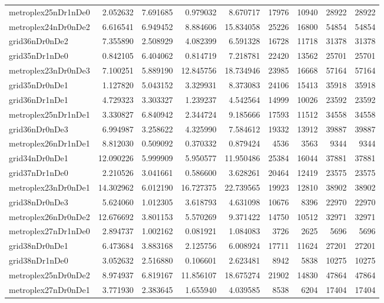 \begin{longtable}{|l|r|r|r|r|r|r|r|r|}
metroplex25nDr1nDe0 & 2.052632 & 7.691685 & 0.979032 & 8.670717 & 17976 & 10940 & 28922 & 28922 \\
metroplex24nDr0nDe2 & 6.616541 & 6.949452 & 8.884606 & 15.834058 & 25226 & 16800 & 54854 & 54854 \\
grid36nDr0nDe2 & 7.355890 & 2.508929 & 4.082399 & 6.591328 & 16728 & 11718 & 31378 & 31378 \\
grid35nDr1nDe0 & 0.842105 & 6.404062 & 0.814719 & 7.218781 & 22420 & 13562 & 25701 & 25701 \\
metroplex23nDr0nDe3 & 7.100251 & 5.889190 & 12.845756 & 18.734946 & 23985 & 16668 & 57164 & 57164 \\
grid35nDr0nDe1 & 1.127820 & 5.043152 & 3.329931 & 8.373083 & 24106 & 15413 & 35918 & 35918 \\
grid36nDr1nDe1 & 4.729323 & 3.303327 & 1.239237 & 4.542564 & 14999 & 10026 & 23592 & 23592 \\
metroplex25nDr1nDe1 & 3.330827 & 6.840942 & 2.344724 & 9.185666 & 17593 & 11512 & 34558 & 34558 \\
grid36nDr0nDe3 & 6.994987 & 3.258622 & 4.325990 & 7.584612 & 19332 & 13912 & 39887 & 39887 \\
metroplex26nDr1nDe1 & 8.812030 & 0.509092 & 0.370332 & 0.879424 & 4536 & 3563 & 9344 & 9344 \\
grid34nDr0nDe1 & 12.090226 & 5.999909 & 5.950577 & 11.950486 & 25384 & 16044 & 37881 & 37881 \\
grid37nDr1nDe0 & 2.210526 & 3.041661 & 0.586600 & 3.628261 & 20464 & 12419 & 23575 & 23575 \\
metroplex23nDr0nDe1 & 14.302962 & 6.012190 & 16.727375 & 22.739565 & 19923 & 12810 & 38902 & 38902 \\
grid38nDr0nDe3 & 5.624060 & 1.012305 & 3.618793 & 4.631098 & 10676 & 8396 & 22970 & 22970 \\
metroplex26nDr0nDe2 & 12.676692 & 3.801153 & 5.570269 & 9.371422 & 14750 & 10512 & 32971 & 32971 \\
metroplex27nDr1nDe0 & 2.894737 & 1.002162 & 0.081921 & 1.084083 & 3726 & 2625 & 5696 & 5696 \\
grid38nDr0nDe1 & 6.473684 & 3.883168 & 2.125756 & 6.008924 & 17711 & 11624 & 27201 & 27201 \\
grid38nDr1nDe0 & 3.052632 & 2.516880 & 0.106601 & 2.623481 & 8942 & 5838 & 10275 & 10275 \\
metroplex25nDr0nDe2 & 8.974937 & 6.819167 & 11.856107 & 18.675274 & 21902 & 14830 & 47864 & 47864 \\
metroplex27nDr0nDe1 & 3.771930 & 2.383645 & 1.655940 & 4.039585 & 8538 & 6204 & 17404 & 17404 \\

\end{longtable}
